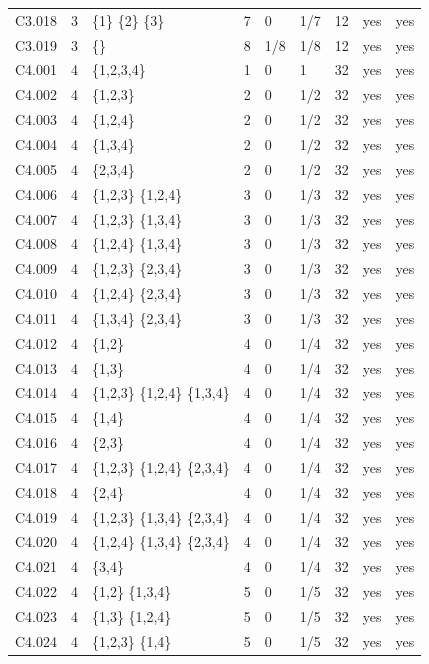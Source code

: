 {\begin{longtable}{@{}llp{6.2cm}rllrll@{}}
C3.018 & 3 & \{1\} \{2\} \{3\} & 7 & 0 & 1/7 & 12 & yes & yes \\
C3.019 & 3 & \{\} & 8 & 1/8 & 1/8 & 12 & yes & yes \\
C4.001 & 4 & \{1,2,3,4\} & 1 & 0 & 1 & 32 & yes & yes \\
C4.002 & 4 & \{1,2,3\} & 2 & 0 & 1/2 & 32 & yes & yes \\
C4.003 & 4 & \{1,2,4\} & 2 & 0 & 1/2 & 32 & yes & yes \\
C4.004 & 4 & \{1,3,4\} & 2 & 0 & 1/2 & 32 & yes & yes \\
C4.005 & 4 & \{2,3,4\} & 2 & 0 & 1/2 & 32 & yes & yes \\
C4.006 & 4 & \{1,2,3\} \{1,2,4\} & 3 & 0 & 1/3 & 32 & yes & yes \\
C4.007 & 4 & \{1,2,3\} \{1,3,4\} & 3 & 0 & 1/3 & 32 & yes & yes \\
C4.008 & 4 & \{1,2,4\} \{1,3,4\} & 3 & 0 & 1/3 & 32 & yes & yes \\
C4.009 & 4 & \{1,2,3\} \{2,3,4\} & 3 & 0 & 1/3 & 32 & yes & yes \\
C4.010 & 4 & \{1,2,4\} \{2,3,4\} & 3 & 0 & 1/3 & 32 & yes & yes \\
C4.011 & 4 & \{1,3,4\} \{2,3,4\} & 3 & 0 & 1/3 & 32 & yes & yes \\
C4.012 & 4 & \{1,2\} & 4 & 0 & 1/4 & 32 & yes & yes \\
C4.013 & 4 & \{1,3\} & 4 & 0 & 1/4 & 32 & yes & yes \\
C4.014 & 4 & \{1,2,3\} \{1,2,4\} \{1,3,4\} & 4 & 0 & 1/4 & 32 & yes & yes \\
C4.015 & 4 & \{1,4\} & 4 & 0 & 1/4 & 32 & yes & yes \\
C4.016 & 4 & \{2,3\} & 4 & 0 & 1/4 & 32 & yes & yes \\
C4.017 & 4 & \{1,2,3\} \{1,2,4\} \{2,3,4\} & 4 & 0 & 1/4 & 32 & yes & yes \\
C4.018 & 4 & \{2,4\} & 4 & 0 & 1/4 & 32 & yes & yes \\
C4.019 & 4 & \{1,2,3\} \{1,3,4\} \{2,3,4\} & 4 & 0 & 1/4 & 32 & yes & yes \\
C4.020 & 4 & \{1,2,4\} \{1,3,4\} \{2,3,4\} & 4 & 0 & 1/4 & 32 & yes & yes \\
C4.021 & 4 & \{3,4\} & 4 & 0 & 1/4 & 32 & yes & yes \\
C4.022 & 4 & \{1,2\} \{1,3,4\} & 5 & 0 & 1/5 & 32 & yes & yes \\
C4.023 & 4 & \{1,3\} \{1,2,4\} & 5 & 0 & 1/5 & 32 & yes & yes \\
C4.024 & 4 & \{1,2,3\} \{1,4\} & 5 & 0 & 1/5 & 32 & yes & yes \\

\end{longtable}}
